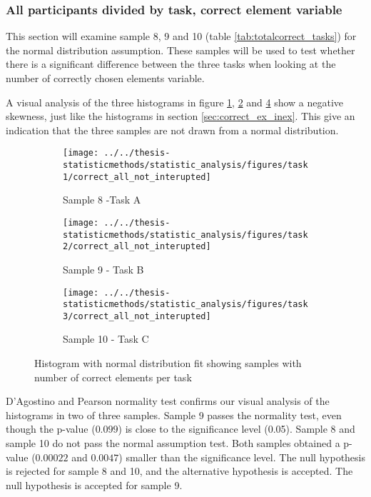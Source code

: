  \subsubsection[Sample 8, 9 and 10]{All participants divided by task,  correct element variable}\label{sec:task123_correct_normaltest}
This section will examine sample 8, 9 and 10 (table \ref{tab:totalcorrect_tasks}) for the normal distribution assumption. These samples will be used to test whether there is a significant difference between the three tasks when looking at the number of correctly chosen elements variable. 

A visual analysis of the three histograms in figure \ref{fig:correctallnotinterupted_task1}, \ref{fig:correctallnotinterupted_task2} and \ref{fig:correctallnotinterupted_task3} show a negative skewness, just like the histograms in section \ref{sec:correct_ex_inex}. This give an indication that the three samples are not drawn from a normal distribution.
 
 \begin{figure}[H]
 	\centering
	 \begin{subfigure}[b]{0.3\textwidth}
	 	\centering
	 	\texttt{[image: ../../thesis-statisticmethods/statistic\_analysis/figures/task1/correct\_all\_not\_interupted]}
	 	\caption{Sample 8 -Task A}
	 	\label{fig:correctallnotinterupted_task1}
	 \end{subfigure}
	\begin{subfigure}[b]{0.3\textwidth}
		\centering
		\texttt{[image: ../../thesis-statisticmethods/statistic\_analysis/figures/task2/correct\_all\_not\_interupted]}
		\caption{Sample 9 - Task B}
		\label{fig:correctallnotinterupted_task2}
	\end{subfigure}
	 \begin{subfigure}[b]{0.3\textwidth}
	 	\centering
	 	\texttt{[image: ../../thesis-statisticmethods/statistic\_analysis/figures/task3/correct\_all\_not\_interupted]}
	 	\caption{Sample 10 - Task C}
	 	\label{fig:correctallnotinterupted_task3}
	 \end{subfigure}
 \caption{Histogram with normal distribution fit showing samples with number of correct elements per task}
 \end{figure}
 D'Agostino and Pearson normality test confirms our visual analysis of the histograms in two of three samples. Sample 9 passes the normality test, even though the p-value ($0.099$) is close to the significance level (0.05). Sample 8 and sample 10 do not pass the normal assumption test. Both samples obtained a p-value ($0.00022$ and $0.0047$) smaller than the significance level. The null hypothesis is rejected for sample 8 and 10, and the alternative hypothesis is accepted. The null hypothesis is accepted for sample 9. 

